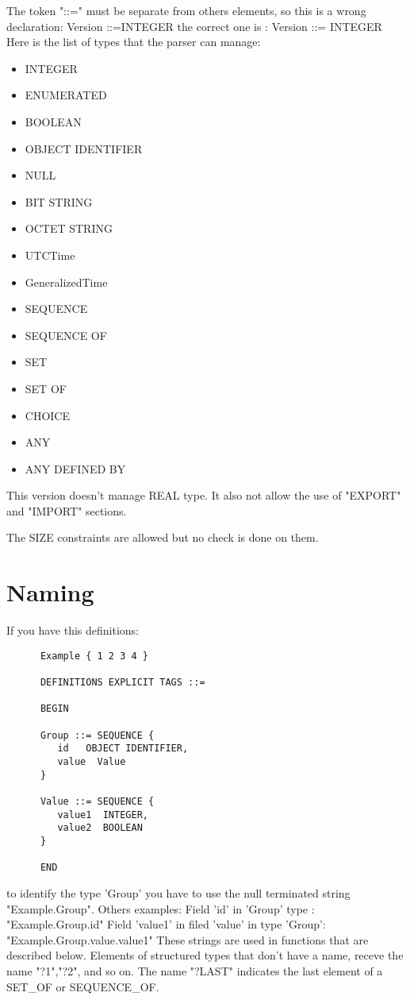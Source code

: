 \par
The token "::=" must be separate from others elements, so this is a wrong declaration:
      Version ::=INTEGER 
the correct one is :   Version ::= INTEGER
Here is the list of types that the parser can manage:
\begin{itemize}

\item      INTEGER
\item      ENUMERATED
\item      BOOLEAN
\item      OBJECT IDENTIFIER
\item      NULL
\item      BIT STRING
\item      OCTET STRING
\item      UTCTime
\item      GeneralizedTime
\item      SEQUENCE
\item      SEQUENCE OF
\item      SET 
\item      SET OF
\item      CHOICE
\item      ANY
\item      ANY DEFINED BY
\end{itemize}

This version doesn't manage REAL type. It also not allow the use of 
"EXPORT" and "IMPORT" sections.

The SIZE constraints are allowed but no check is done on them.



\section{Naming}
If you have this definitions:

\begin{verbatim}
      Example { 1 2 3 4 }

      DEFINITIONS EXPLICIT TAGS ::=

      BEGIN 

      Group ::= SEQUENCE {
         id   OBJECT IDENTIFIER,
         value  Value
      }

      Value ::= SEQUENCE {
         value1  INTEGER,
         value2  BOOLEAN 
      }

      END
\end{verbatim}

to identify the type 'Group' you have to use the null terminated string "Example.Group".
Others examples:
Field 'id' in 'Group' type :  "Example.Group.id"
Field 'value1' in filed 'value' in type 'Group':   "Example.Group.value.value1" 
These strings are used in functions that are described below.
Elements of structured types that don't have a name, receve the name "?1","?2", and so on. 
The name "?LAST" indicates the last element of a SET\_OF or SEQUENCE\_OF.

